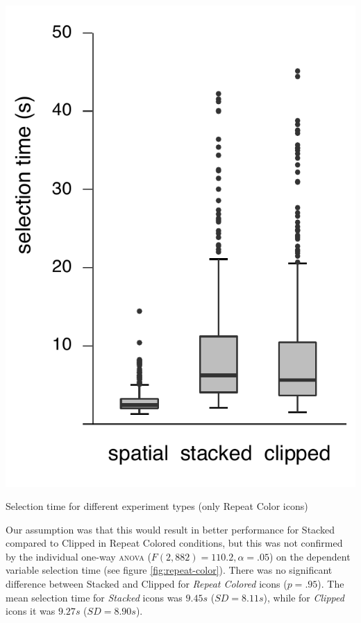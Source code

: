 \documentclass[nobib]{tufte-book} %
\begin{document}
\begin{marginfigure}
  \includegraphics[width=\linewidth]{repeat-color.pdf}
  \caption{Selection time for different experiment types (only Repeat Color icons)}
  \label{fig:repeat-color}
\end{marginfigure}

Our assumption was that this would result in better performance for Stacked compared to Clipped in Repeat Colored conditions, but this was not confirmed by the individual one-way \textsc{anova} ($F(2,882) = 110.2, \alpha = .05$) on the dependent variable selection time (see figure \ref{fig:repeat-color}). There was no significant difference between Stacked and Clipped for \emph{Repeat Colored} icons ($p = .95$). The mean selection time for \emph{Stacked} icons was $9.45 s$ ($SD = 8.11 s$), while for \emph{Clipped} icons it was $9.27 s$ ($SD = 8.90 s$).
\end{document}
